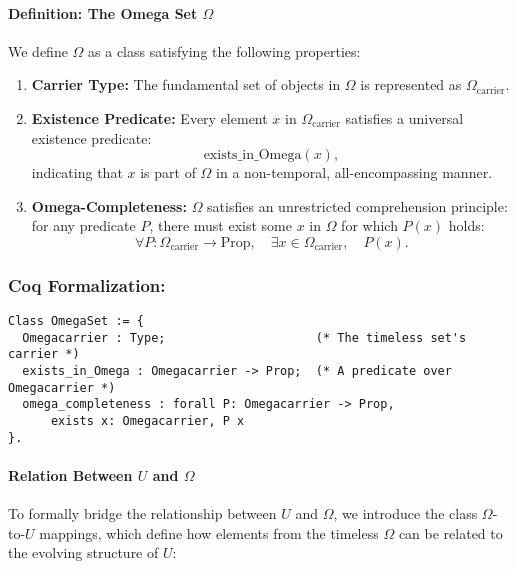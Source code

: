 \documentclass[12pt]{article}
\begin{document}
\paragraph{Definition: The Omega Set \( \Omega \)}
We define \( \Omega \) as a class satisfying the following properties:

\begin{enumerate}
    \item \textbf{Carrier Type:} The fundamental set of objects in \( \Omega \) is represented as \( \Omega_{\text{carrier}} \).
    \item \textbf{Existence Predicate:} Every element \( x \) in \( \Omega_{\text{carrier}} \) satisfies a universal existence predicate:
    \[
    \text{exists\_in\_Omega}(x),
    \]
    indicating that \( x \) is part of \( \Omega \) in a non-temporal, all-encompassing manner.
    \item \textbf{Omega-Completeness:} \( \Omega \) satisfies an unrestricted comprehension principle: for any predicate \( P \), there must exist some \( x \) in \( \Omega \) for which \( P(x) \) holds:
    \begin{equation}
        \forall P: \Omega_{\text{carrier}} \to \text{Prop}, \quad
        \exists x \in \Omega_{\text{carrier}}, \quad P(x).
    \end{equation}
\end{enumerate}

\subsubsection{Coq Formalization:}
\begin{lstlisting}[language=Coq]
Class OmegaSet := {
  Omegacarrier : Type;                     (* The timeless set's carrier *)
  exists_in_Omega : Omegacarrier -> Prop;  (* A predicate over Omegacarrier *)
  omega_completeness : forall P: Omegacarrier -> Prop,
      exists x: Omegacarrier, P x
}.
\end{lstlisting}

\paragraph{Relation Between \( U \) and \( \Omega \)}
To formally bridge the relationship between \( U \) and \( \Omega \), we introduce the class \( \Omega \)-to-\( U \) mappings, which define how elements from the timeless \( \Omega \) can be related to the evolving structure of \( U \):
\end{document}
